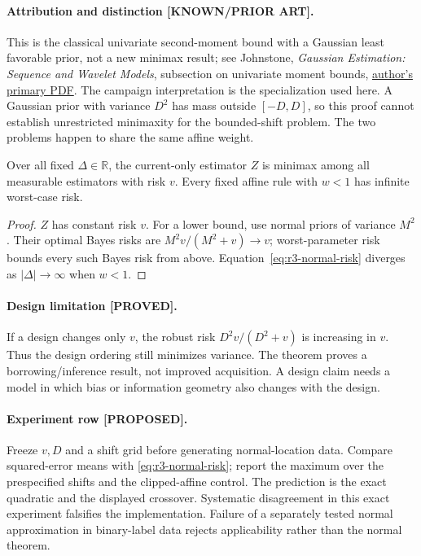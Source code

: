 \paragraph{Attribution and distinction [KNOWN/PRIOR ART].}
This is the classical univariate second-moment bound with a Gaussian
least favorable prior, not a new minimax result; see Johnstone,
\emph{Gaussian Estimation: Sequence and Wavelet Models}, subsection on
univariate moment bounds,
\href{https://imjohnstone.su.domains/GE_08_09_17.pdf}{author's primary PDF}.
The campaign interpretation is the specialization used here.
A Gaussian prior with variance $D^2$ has mass outside $[-D,D]$, so this
proof cannot establish unrestricted minimaxity for the bounded-shift
problem.  The two problems happen to share the same affine weight.

\begin{proposition}
Over all fixed $\Delta\in\mathbb R$, the current-only estimator $Z$ is
minimax among all measurable estimators with risk $v$.  Every fixed
affine rule with $w<1$ has infinite worst-case risk.
\end{proposition}
\begin{proof}
$Z$ has constant risk $v$.  For a lower bound, use normal priors of
variance $M^2$.  Their optimal Bayes risks are $M^2v/(M^2+v)\to v$;
worst-parameter risk bounds every such Bayes risk from above.
Equation~\eqref{eq:r3-normal-risk} diverges as $|\Delta|\to\infty$ when
$w<1$.
\end{proof}

\paragraph{Design limitation [PROVED].}
If a design changes only $v$, the robust risk $D^2v/(D^2+v)$ is increasing
in $v$.  Thus the design ordering still minimizes variance.  The theorem
proves a borrowing/inference result, not improved acquisition.  A design
claim needs a model in which bias or information geometry also changes
with the design.

\paragraph{Experiment row [PROPOSED].}
Freeze $v,D$ and a shift grid before generating normal-location data.
Compare squared-error means with \eqref{eq:r3-normal-risk}; report the
maximum over the prespecified shifts and the clipped-affine control.
The prediction is the exact quadratic and the displayed crossover.
Systematic disagreement in this exact experiment falsifies the
implementation.  Failure of a separately tested normal approximation in
binary-label data rejects applicability rather than the normal theorem.

